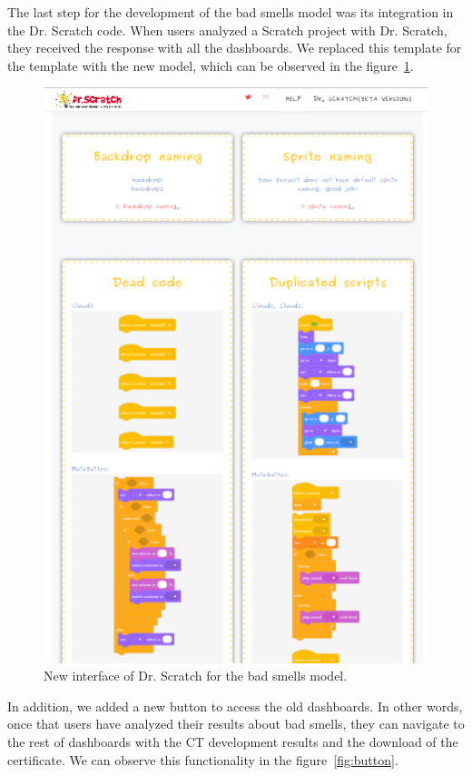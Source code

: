 The last step for the development of the bad smells model was its integration in the Dr. Scratch code. When users analyzed a Scratch project with Dr. Scratch, they received the response with all the dashboards. We replaced this template for the template with the new model, which can be observed in the figure~\ref{fig:newmodel}.

\begin{figure}
    \centering
    \includegraphics[width=12cm,                         keepaspectratio]{img/newmodel.png}
    \caption{New interface of Dr. Scratch for the bad smells model.}
    \label{fig:newmodel}
\end{figure}

In addition, we added a new button to access the old dashboards. In other words, once that users have analyzed their results about bad smells, they can navigate to the rest of dashboards with the CT development results and the download of the certificate. We can observe this functionality in the figure~\ref{fig:button}.

